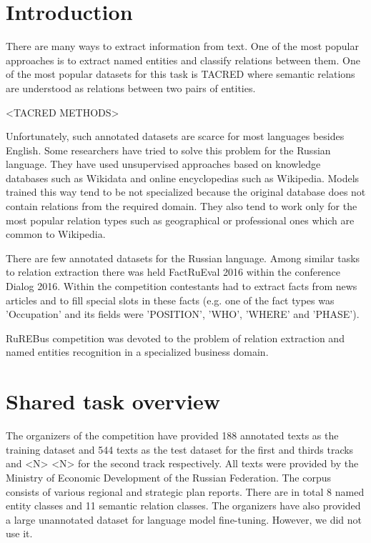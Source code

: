 \documentclass{dialogue}
\begin{document}

\section{Introduction}
There are many ways to extract information from text. One of the most popular approaches is to extract named entities and classify relations between them. One of the most popular datasets for this task is TACRED \cite{tacred} where semantic relations are understood as relations between two pairs of entities. 

<TACRED METHODS>

Unfortunately, such annotated datasets are scarce for most languages besides English. Some researchers have tried to solve this problem for the Russian language. They have used unsupervised approaches based on knowledge databases such as Wikidata and online encyclopedias such as Wikipedia. Models trained this way tend to be not specialized because the original database does not contain relations from the required domain. They also tend to work only for the most popular relation types such as geographical or professional ones which are common to Wikipedia.

There are few annotated datasets for the Russian language. Among similar tasks to relation extraction there was held FactRuEval 2016 within the conference Dialog 2016. Within the competition contestants had to extract facts from news articles and to fill special slots in these facts (e.g. one of the fact types was 'Occupation' and its fields were 'POSITION', 'WHO', 'WHERE' and 'PHASE').

RuREBus competition was devoted to the problem of relation extraction and named entities recognition in a specialized business domain.

\section{Shared task overview}
The organizers of the competition have provided 188 annotated texts as the training dataset and 544 texts as the test dataset for the first and thirds tracks and <N> <N> for the second track respectively. All texts were provided by the Ministry of Economic Development of the Russian Federation. The corpus consists of various regional and strategic plan reports. There are in total 8 named entity classes and 11 semantic relation classes. The organizers have also provided a large unannotated dataset for language model fine-tuning. However, we did not use it.
\end{document}
